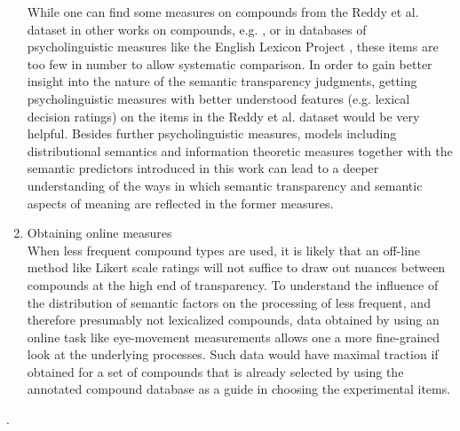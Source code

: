 \begin{enumerate}
While one can find some measures on compounds from the
Reddy et al. dataset in other works on compounds,
e.g. \citet{Juhasz:2015}, or in databases of
psycholinguistic measures like the English Lexicon Pro\-ject
\citep{Balotaetal:2007}, these items are too few in number to allow
systematic comparison. In order to gain better insight into the nature
of the semantic transparency judgments, getting psycholinguistic
measures with better understood features (e.g. lexical decision
ratings) on the items in the Reddy et al. dataset would be very
helpful. Besides further psycholinguistic measures, models including
distributional semantics and information theoretic measures together
with the semantic predictors introduced in this work can lead to a
deeper understanding of the ways in which semantic transparency and
semantic aspects of meaning are reflected in the former measures.
\item Obtaining online measures\\
When less frequent compound types are used, it is likely that an
off-line method like Likert scale ratings will not suffice to draw out
nuances between compounds at the high end of transparency. To
understand the influence of the distribution of semantic factors on
the processing of less frequent, and therefore presumably not
lexicalized compounds, data obtained by using an online task like
eye-movement measurements allows one a more fine-grained look at the underlying processes. 
Such data would have
maximal traction if obtained for a set of compounds that is already selected by
using the annotated compound database as a guide in choosing
the experimental items.
\end{enumerate}




. 


